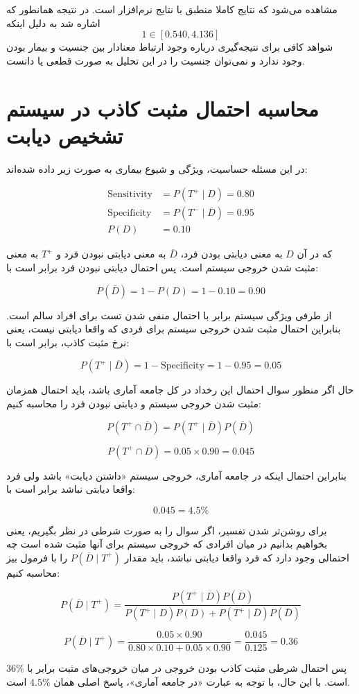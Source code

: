 \documentclass[]{exam}
\begin{document}
مشاهده می‌شود که نتایج کاملا منطبق با نتایج نرم‌افزار  است.
در نتیجه همانطور که اشاره شد به دلیل اینکه
$$1 \in [0.540, 4.136]$$
شواهد کافی برای نتیجه‌گیری درباره وجود ارتباط معنادار بین جنسیت و بیمار بودن وجود ندارد و
نمی‌توان جنسیت را در این تحلیل به صورت قطعی  یا  دانست.

\section{محاسبه احتمال مثبت کاذب در سیستم تشخیص دیابت}

در این مسئله حساسیت، ویژگی و شیوع بیماری به صورت زیر داده شده‌اند:

\begin{align*}
    \text{Sensitivity} &= P(T^+ \mid D) = 0.80 \\
    \text{Specificity} &= P(T^- \mid \overline{D}) = 0.95 \\
    P(D) &= 0.10
\end{align*}

که در آن \(D\) به معنی دیابتی بودن فرد، \(\overline{D}\) به معنی دیابتی نبودن فرد و
\(T^+\) به معنی مثبت شدن خروجی سیستم است.
پس احتمال دیابتی نبودن فرد برابر است با:

\[
    P(\overline{D}) = 1 - P(D) = 1 - 0.10 = 0.90
\]

از طرفی ویژگی سیستم برابر با احتمال منفی شدن تست برای افراد سالم است. بنابراین احتمال مثبت شدن خروجی سیستم برای فردی که واقعا دیابتی نیست، یعنی نرخ مثبت کاذب، برابر است با:

\[
    P(T^+ \mid \overline{D}) = 1 - \text{Specificity} = 1 - 0.95 = 0.05
\]

حال اگر منظور سوال احتمال این رخداد در کل جامعه آماری باشد، باید احتمال همزمان مثبت شدن خروجی سیستم و دیابتی نبودن فرد را محاسبه کنیم:

\[
    P(T^+ \cap \overline{D}) =
    P(T^+ \mid \overline{D}) P(\overline{D})
\]

\[
    P(T^+ \cap \overline{D}) = 0.05 \times 0.90 = 0.045
\]

بنابراین احتمال اینکه در جامعه آماری، خروجی سیستم «داشتن دیابت» باشد ولی فرد واقعا دیابتی نباشد برابر است با:

\[
    \boxed{0.045 = 4.5\%}
\]

برای روشن‌تر شدن تفسیر، اگر سوال را به صورت شرطی در نظر بگیریم، یعنی بخواهیم بدانیم در میان افرادی که خروجی سیستم برای آنها مثبت شده است چه احتمالی وجود دارد که فرد واقعا دیابتی نباشد، باید مقدار
\(P(\overline{D} \mid T^+)\)
را با فرمول بیز محاسبه کنیم:

\[
    P(\overline{D} \mid T^+) =
    \frac{P(T^+ \mid \overline{D})P(\overline{D})}
    {P(T^+ \mid D)P(D) + P(T^+ \mid \overline{D})P(\overline{D})}
\]

\[
    P(\overline{D} \mid T^+) =
    \frac{0.05 \times 0.90}
    {0.80 \times 0.10 + 0.05 \times 0.90}
    =
    \frac{0.045}{0.125}
    =
    0.36
\]

پس احتمال شرطی مثبت کاذب بودن خروجی در میان خروجی‌های مثبت برابر با
\(\boxed{36\%}\)
است. با این حال، با توجه به عبارت «در جامعه آماری»، پاسخ اصلی همان
\(\boxed{4.5\%}\)
است.
\end{document}
